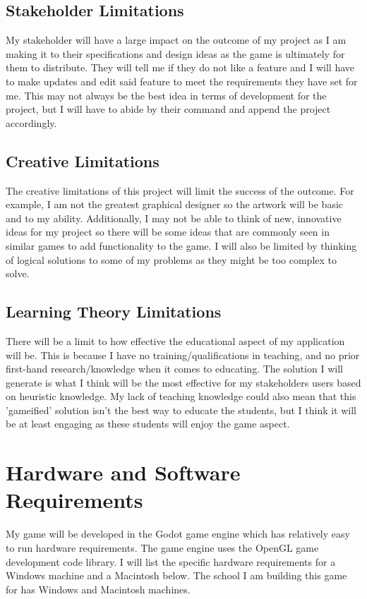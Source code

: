 \documentclass[12pt]{report}
\begin{document}
\pagebreak

\subsection{Stakeholder Limitations}
My stakeholder will have a large impact on the outcome of my project as I am making it to their specifications and design ideas as the game is ultimately for them to distribute. They will tell me if they do not like a feature and I will have to make updates and edit said feature to meet the requirements they have set for me. This may not always be the best idea in terms of development for the project, but I will have to abide by their command and append the project accordingly. 

\subsection{Creative Limitations}
The creative limitations of this project will limit the success of the outcome. For example, I am not the greatest graphical designer so the artwork will be basic and to my ability. Additionally, I may not be able to think of new, innovative ideas for my project so there will be some ideas that are commonly seen in similar games to add functionality to the game. I will also be limited by thinking of logical solutions to some of my problems as they might be too complex to solve.

\subsection{Learning Theory Limitations}
There will be a limit to how effective the educational aspect of my application will be. This is because I have no training/qualifications in teaching, and no prior first-hand research/knowledge when it comes to educating. The solution I will generate is what I think will be the most effective for my stakeholders users based on heuristic knowledge. My lack of teaching knowledge could also mean that this 'gameified' solution isn't the best way to educate the students, but I think it will be at least engaging as these students will enjoy the game aspect.   

\section{Hardware and Software Requirements}
My game will be developed in the Godot game engine which has relatively easy to run hardware requirements. The game engine uses the OpenGL game development code library. I will list the specific hardware requirements for a Windows machine and a Macintosh below. The school I am building this game for has Windows and Macintosh machines. 
\end{document}
